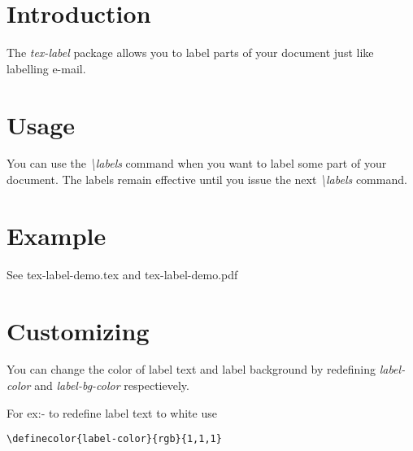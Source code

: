 \documentclass{article}
\newcommand{\texlabel}{{\em tex-label}}
\newcommand{\labelscom}{{\em \textbackslash labels}}
\begin{document}
\section{Introduction}
The \texlabel{} package allows you to label parts of your document
just like labelling e-mail.

\section{Usage}
You can use the \labelscom{} command when you want to label some part of
your document. The labels remain effective until you issue the next
\labelscom{} command.

\section{Example}
See tex-label-demo.tex and tex-label-demo.pdf

\section{Customizing}
You can change the color of label text and label background by
redefining {\em label-color} and {\em label-bg-color} respectievely. 

For ex:- to redefine label text to white use

\begin{verbatim}
\definecolor{label-color}{rgb}{1,1,1}
\end{verbatim}
\end{document}
